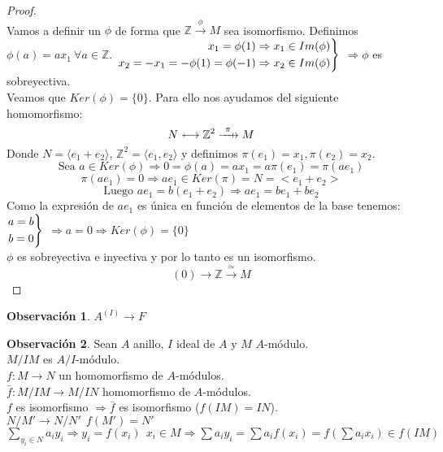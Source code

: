 \documentclass{article}
\def\flechaInyectiva{\mathrel{\mkern0mu  \vcenter{\hbox{$\scriptscriptstyle+$}}%
		\mkern-9mu{\longrightarrow}}}
\def\xFlechaSobreyectiva #1{\mathrel{\ooalign{\hfil$\mapstochar\mkern5mu$\thinspace\thinspace\cr$\xrightarrow{#1}$\cr}}}
\newenvironment{rcases}
{\left.\begin{aligned}}
	{\end{aligned}\right\rbrace}
\theoremstyle{theorem-style}  %
\theoremstyle{definition}
\newtheorem*{observation}{Observación} %
\theoremstyle{example-style}
\begin{document}
\begin{proof}
	\ \\
	Vamos a definir un $\phi$ de forma que $\mathbb{Z}\xrightarrow{\ \phi\ }M$ sea isomorfismo. 
	Definimos $\phi(a)=ax_1 \ \forall a \in \mathbb{Z}$. 
	$\begin{rcases}
		x_1=\phi(1)\Rightarrow x_1\in Im(\phi) \\
		x_2=-x_1=-\phi(1)=\phi(-1)\Rightarrow x_2 \in Im(\phi)
	\end{rcases}$
	$\Rightarrow \phi$ es sobreyectiva. \\ 
	Veamos que $Ker(\phi)=\{0\}$. Para ello nos ayudamos del siguiente homomorfismo:
	\[ N\flechaInyectiva \mathbb{Z}^2 \xFlechaSobreyectiva{\ \pi\ } M\]
	Donde $N=\langle e_1+e_2\rangle$, $\mathbb{Z}^2=\langle e_1,e_2\rangle$ y definimos $\pi(e_1)=x_1, \pi(e_2)=x_2$.
	\[ \text{Sea } a \in Ker(\phi) \Rightarrow 0 = \phi(a)=ax_1=a\pi(e_1)=\pi(ae_1)\]
	\[\pi(ae_1)=0 \Rightarrow ae_1 \in Ker(\pi)=N=<e_1 + e_2>\]
	\[\text{Luego } ae_1=b(e_1+e_2) \Rightarrow ae_1=be_1+be_2\]
	Como la expresión de $ae_1$ es única en función de elementos de la base tenemos:\\
	$\begin{rcases}
			a=b \\
			b=0
	\end{rcases}$
	$\Rightarrow a=0 \Rightarrow Ker(\phi)=\{0\}$\\
	$\phi$ es sobreyectiva e inyectiva y por lo tanto es un isomorfismo.
	\[(0)\xrightarrow{\ \ } \mathbb{Z} \xrightarrow{\ \simeq\ }M\]
\end{proof}

\begin{observation}
	$A^{(I)} \rightarrow F$
\end{observation}

\begin{observation}
	Sean $A$ anillo, $I$ ideal de $A$ y $M$ $A$-módulo.\\
	$M/IM$ es $A/I$-módulo.\\
	$f:M\rightarrow N$ un homomorfismo de $A$-módulos.\\
	$\bar{f}:M/IM\rightarrow M/IN$ homomorfismo de $A$-módulos.\\
	$f$ es isomorfismo $\Rightarrow \bar{f}$ es isomorfismo ($f(IM)=IN$).\\
	$N/M'\rightarrow N/N' \ \ f(M')=N'$\\
	$\sum_{y_i\in N}a_iy_i \Rightarrow y_i=f(x_i) \ \ x_i\in M \Rightarrow \sum a_iy_i=\sum a_if(x_i)=f(\sum a_ix_i)\in f(IM)$
\end{observation}
\end{document}
